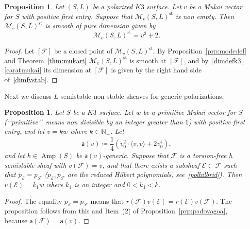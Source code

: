 \documentclass[11pt]{amsart}
\newcommand{\NN}{{\mathbb N}}
\let\mathcal\mathscr
\def\cE{\mathcal{E}}
\def\cF{\mathcal{F}}
\def\cM{\mathcal{M}}
\DeclareMathOperator{\Amp}{Amp}
\DeclareMathOperator{\st}{st}
\newcommand{\la}{\langle}
\newcommand{\ra}{\rangle}
\newtheorem{prp}[lmm]{Proposition}
\theoremstyle{definition}
\theoremstyle{remark}
\begin{document}
%
\begin{prp}\label{prp:modstab}
%
Let  $(S,L)$ be a polarized $K3$ surface. Let $v$ be a Mukai vector for $S$ 
  with positive first entry. Suppose that $\cM_v(S,L)^{\st}$ is non empty. Then $\cM_v(S,L)^{\st}$ is smooth of pure dimension given by
%
\begin{equation}\label{dimfvstab}
%
\cM_v(S,L)^{\st}=v^2+2.
%
\end{equation}
%
%
\end{prp}
%
%
\begin{proof}
%
Let $[\cF]$ be a closed point of $\cM_v(S,L)^{\st}$. By Proposition~\ref{prp:modedef} and Theorem~\ref{thm:mukart} $\cM_v(S,L)^{\st}$ is smooth at $[\cF]$, and  by~\eqref{dimdefk3}, \eqref{caratmukai} its dimension at $[\cF]$ is given by the right hand side of~\eqref{dimfvstab}.
%
\end{proof}
%
Next we discuss $L$ semistable non stable sheaves  for generic polarizations.
%
\begin{prp}\label{prp:stabnonstabk3}
%
Let $S$ be a $K3$ surface. Let $w$ be a primitive 
Mukai vector for $S$ (\lq\lq primitive\rq\rq\  means non divisible by an integer greater than $1$)
 with positive first entry, and let $v=kw$ where $k\in\NN_{+}$. Let 
%
\begin{equation}\label{adivu}
%
{\mathsf a}(v)\coloneqq \frac{1}{4}\left(v_0^2\cdot\la v,v\ra+2 v_0^4\right),
%
\end{equation}
%
and let $h\in\Amp(S)$ be ${\mathsf a}(v)$-generic. Suppose that $\cF$ is a torsion-free  $h$ semistable sheaf with $v(\cF)=v$, and that there exists a subsheaf 
$\cE\subset\cF$ such that $p_{\cE}=p_{\cF}$ ($p_{\cE},p_{\cF}$ are the reduced Hilbert polynomials, see~\eqref{polhilbrid}). Then 
$v(\cE)=k_1w$ where $k_1$ is an integer and $0<k_1<k$. 
%
\end{prp}
%
%
\begin{proof}
%
The equality $p_{\cE}=p_{\cF}$ means that $r(\cF) v(\cE)=r(\cE)v(\cF)$. The proposition follows from this and Item~(2) of Proposition~\ref{prp:padovagoa}, because  ${\mathsf a}(\cF)={\mathsf a}(v)$.
%
\end{proof}
%


%
\end{document}
